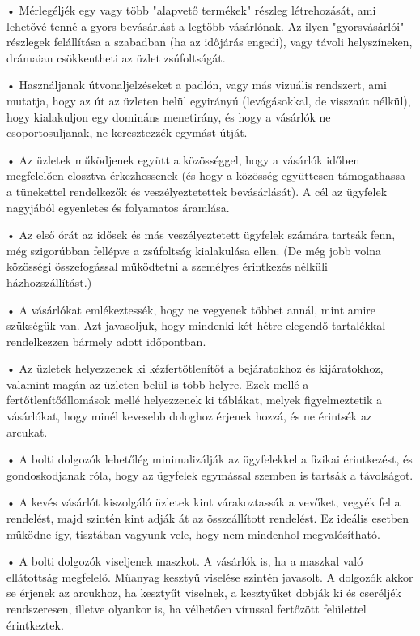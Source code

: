 \documentclass[onecolumn,journal]{IEEEtran}
\begin{document}
\begin{multicols}{2}
• Mérlegéljék egy vagy több "alapvető termékek" részleg létrehozását, ami lehetővé tenné a gyors bevásárlást a legtöbb vásárlónak. Az ilyen "gyorsvásárlói" részlegek felállítása a szabadban (ha az időjárás engedi), vagy távoli helyszíneken, drámaian csökkentheti az üzlet zsúfoltságát.

• Használjanak útvonaljelzéseket a padlón, vagy más vizuális rendszert, ami mutatja, hogy az út az üzleten belül egyirányú (levágásokkal, de visszaút nélkül), hogy kialakuljon egy domináns menetirány, és hogy a vásárlók ne csoportosuljanak, ne keresztezzék egymást útját.

• Az üzletek működjenek együtt a közösséggel, hogy a vásárlók időben megfelelően elosztva érkezhessenek (és hogy a közösség együttesen támogathassa a tünekettel rendelkezők és veszélyeztetettek bevásárlását). A cél az ügyfelek nagyjából egyenletes és folyamatos áramlása.

• Az első órát az idősek és más veszélyeztetett ügyfelek számára tartsák fenn, még szigorúbban fellépve a zsúfoltság kialakulása ellen. (De még jobb volna közösségi összefogással működtetni a személyes érintkezés nélküli házhozszállítást.)

• A vásárlókat emlékeztessék, hogy ne vegyenek többet annál, mint amire szükségük van. Azt javasoljuk, hogy mindenki két hétre elegendő tartalékkal rendelkezzen bármely adott időpontban.

• Az üzletek helyezzenek ki kézfertőtlenítőt a bejáratokhoz és kijáratokhoz, valamint magán az üzleten belül is több helyre. Ezek mellé a fertőtlenítőállomások mellé helyezzenek ki táblákat, melyek figyelmeztetik a vásárlókat, hogy minél kevesebb dologhoz érjenek hozzá, és ne érintsék az arcukat.

• A bolti dolgozók lehetőlég minimalizálják az ügyfelekkel a fizikai érintkezést, és gondoskodjanak róla, hogy az ügyfelek egymással szemben is tartsák a távolságot.

• A kevés vásárlót kiszolgáló üzletek kint várakoztassák a vevőket, vegyék fel a rendelést, majd szintén kint adják át az összeállított rendelést. Ez ideális esetben működne így, tisztában vagyunk vele, hogy nem mindenhol megvalósítható.

• A bolti dolgozók viseljenek maszkot. A vásárlók is, ha a maszkal való ellátottság megfelelő. Műanyag kesztyű viselése szintén javasolt.
A dolgozók akkor se érjenek az arcukhoz, ha kesztyűt viselnek, a kesztyűket dobják ki és cseréljék rendszeresen, illetve olyankor is, ha vélhetően vírussal fertőzött felülettel érintkeztek.


\end{multicols}
\end{document}
